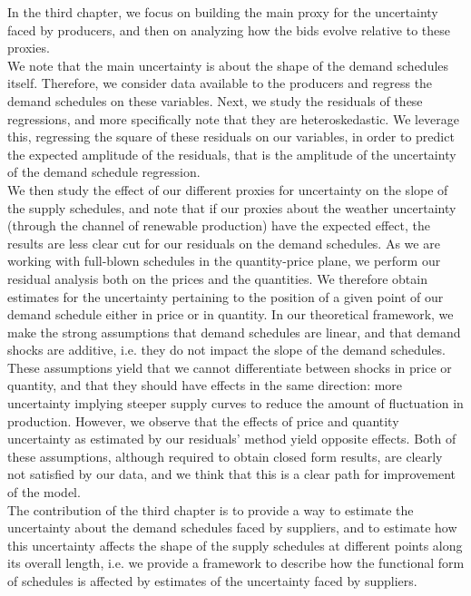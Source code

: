 In the third chapter, we focus on building the main proxy for the uncertainty faced by producers, and then on analyzing how the bids evolve relative to these proxies.\\

We note that the main uncertainty is about the shape of the demand schedules itself. Therefore, we consider data available to the producers and regress the demand schedules on these variables. Next, we study the residuals of these regressions, and more specifically note that they are heteroskedastic. We leverage this, regressing the square of these residuals on our variables, in order to predict the expected amplitude of the residuals, that is the amplitude of the uncertainty of the demand schedule regression.\\

We then study the effect of our different proxies for uncertainty on the slope of the supply schedules, and note that if our proxies about the weather uncertainty (through the channel of renewable production) have the expected effect, the results are less clear cut for our residuals on the demand schedules. As we are working with full-blown schedules in the quantity-price plane, we perform our residual analysis both on the prices and the quantities. We therefore obtain estimates for the uncertainty pertaining to the position of a given point of our demand schedule either in price or in quantity. In our theoretical framework, we make the strong assumptions that demand schedules are linear, and that demand shocks are additive, i.e. they do not impact the slope of the demand schedules. These assumptions yield that we cannot differentiate between shocks in price or quantity, and that they should have effects in the same direction: more uncertainty implying steeper supply curves to reduce the amount of fluctuation in production. However, we observe that the effects of price and quantity uncertainty as estimated by our residuals' method yield opposite effects. Both of these assumptions, although required to obtain closed form results, are clearly not satisfied by our data, and we think that this is a clear path for improvement of the model.  \\

The contribution of the third chapter is to provide a way to estimate the uncertainty about the demand schedules faced by suppliers, and to estimate how this uncertainty affects the shape of the supply schedules at different points along its overall length, i.e. we provide a framework to describe how the functional form of schedules is affected by estimates of the uncertainty faced by suppliers.


